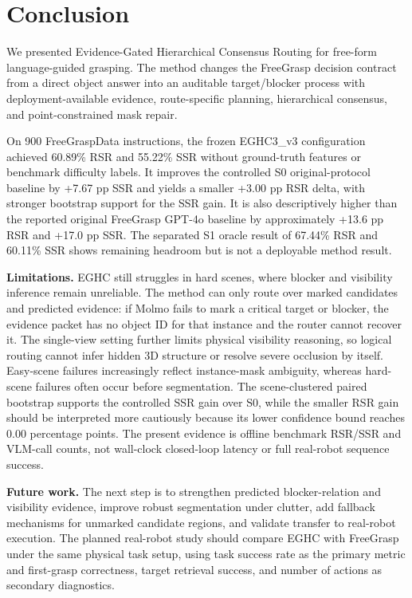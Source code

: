 \section{Conclusion}

We presented Evidence-Gated Hierarchical Consensus Routing for free-form language-guided grasping. The method changes the FreeGrasp decision contract from a direct object answer into an auditable target/blocker process with deployment-available evidence, route-specific planning, hierarchical consensus, and point-constrained mask repair.

On 900 FreeGraspData instructions, the frozen EGHC3\_v3 configuration achieved 60.89\% RSR and 55.22\% SSR without ground-truth features or benchmark difficulty labels. It improves the controlled S0 original-protocol baseline by +7.67 pp SSR and yields a smaller +3.00 pp RSR delta, with stronger bootstrap support for the SSR gain. It is also descriptively higher than the reported original FreeGrasp GPT-4o baseline by approximately +13.6 pp RSR and +17.0 pp SSR. The separated S1 oracle result of 67.44\% RSR and 60.11\% SSR shows remaining headroom but is not a deployable method result.

\textbf{Limitations.} EGHC still struggles in hard scenes, where blocker and visibility inference remain unreliable. The method can only route over marked candidates and predicted evidence: if Molmo fails to mark a critical target or blocker, the evidence packet has no object ID for that instance and the router cannot recover it. The single-view setting further limits physical visibility reasoning, so logical routing cannot infer hidden 3D structure or resolve severe occlusion by itself. Easy-scene failures increasingly reflect instance-mask ambiguity, whereas hard-scene failures often occur before segmentation. The scene-clustered paired bootstrap supports the controlled SSR gain over S0, while the smaller RSR gain should be interpreted more cautiously because its lower confidence bound reaches 0.00 percentage points. The present evidence is offline benchmark RSR/SSR and VLM-call counts, not wall-clock closed-loop latency or full real-robot sequence success.

\textbf{Future work.} The next step is to strengthen predicted blocker-relation and visibility evidence, improve robust segmentation under clutter, add fallback mechanisms for unmarked candidate regions, and validate transfer to real-robot execution. The planned real-robot study should compare EGHC with FreeGrasp under the same physical task setup, using task success rate as the primary metric and first-grasp correctness, target retrieval success, and number of actions as secondary diagnostics.
